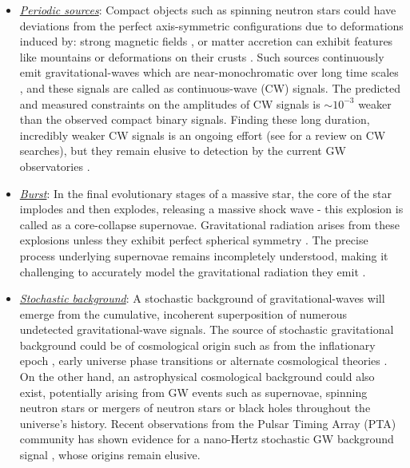\begin{itemize}

\item \underline{\textit{Periodic sources}}: Compact objects such as spinning neutron stars could have deviations from the perfect axis-symmetric configurations due to deformations induced by: strong magnetic fields \cite{Chandrasekhar:1953zz}, or matter accretion can exhibit features like mountains or deformations on their crusts \cite{Brown:1997ji,Bildsten:1998ey}. Such sources continuously emit gravitational-waves which are near-monochromatic over long time scales \cite{Thorne:1980ru}, and these signals are called as continuous-wave (CW) signals. The predicted and measured constraints on the amplitudes of CW signals is $\sim 10^{-3}$ weaker than the observed compact binary signals. Finding these long duration, incredibly weaker CW signals is an ongoing effort (see \cite{Riles:2022wwz} for a review on CW searches), but they remain elusive to detection by the current GW observatories \cite{Pagliaro:2023bvi}. 

\item \underline{\textit{Burst}}:   In the final evolutionary stages of a massive star, the core of the star implodes and then explodes, releasing a massive shock wave - this explosion is called as a core-collapse supernovae. Gravitational radiation arises from these explosions unless they exhibit perfect spherical symmetry \cite{Abdikamalov:2020jzn}. The precise process underlying supernovae remains incompletely understood, making it challenging to accurately model the gravitational radiation they emit \cite{Abdikamalov:2020jzn, Janka:2012wk}.

\item \underline{\textit{Stochastic background}}: A stochastic background of gravitational-waves will emerge from the cumulative, incoherent superposition of numerous undetected gravitational-wave signals. The source of stochastic gravitational background could be of cosmological origin such as from the inflationary epoch \cite{Barnaby:2011qe}, early universe phase transitions \cite{Hindmarsh:2015qta} or alternate cosmological theories \cite{Buonanno:1996xc}. On the other hand, an astrophysical cosmological background could also exist, potentially arising from GW events such as supernovae, spinning neutron stars or mergers of neutron stars or black holes throughout the universe's history. Recent observations \cite{Reardon:2023gzh,NANOGrav:2023hde,EPTA:2023fyk,Xu:2023wog} from the Pulsar Timing Array (PTA) community has shown evidence for a nano-Hertz stochastic GW background signal \cite{Hellings:1983fr}, whose origins remain elusive. 


\end{itemize}

